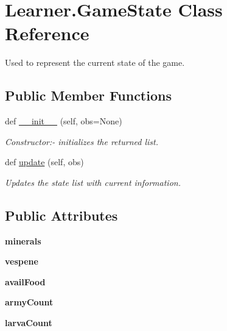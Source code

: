 \hypertarget{classLearner_1_1GameState}{}\section{Learner.\+Game\+State Class Reference}
\label{classLearner_1_1GameState}


Used to represent the current state of the game.  


\subsection*{Public Member Functions}
\begin{DoxyCompactItemize}
\item 
def \hyperlink{classLearner_1_1GameState_a1839473bc83bc75d01684ec5aea9cbb8}{\+\_\+\+\_\+init\+\_\+\+\_\+} (self, obs=None)
\begin{DoxyCompactList}\small\item\em Constructor\+:-\/ initializes the returned list. \end{DoxyCompactList}\item 
def \hyperlink{classLearner_1_1GameState_a6f8a28737862d479f5bf027296613ea1}{update} (self, obs)
\begin{DoxyCompactList}\small\item\em Updates the state list with current information. \end{DoxyCompactList}\end{DoxyCompactItemize}
\subsection*{Public Attributes}
\begin{DoxyCompactItemize}
\item 
{\bfseries minerals}\hypertarget{classLearner_1_1GameState_a386c1763948e0b1d0d5cccfb2249dab5}{}\label{classLearner_1_1GameState_a386c1763948e0b1d0d5cccfb2249dab5}

\item 
{\bfseries vespene}\hypertarget{classLearner_1_1GameState_a1cfbd3d55a66b1897be33620ace654c0}{}\label{classLearner_1_1GameState_a1cfbd3d55a66b1897be33620ace654c0}

\item 
{\bfseries avail\+Food}\hypertarget{classLearner_1_1GameState_ac42a209d42ef18e10585f3adeb1b71c9}{}\label{classLearner_1_1GameState_ac42a209d42ef18e10585f3adeb1b71c9}

\item 
{\bfseries army\+Count}\hypertarget{classLearner_1_1GameState_a2e78cbeaff230eaaa0abab498f5f5930}{}\label{classLearner_1_1GameState_a2e78cbeaff230eaaa0abab498f5f5930}

\item 
{\bfseries larva\+Count}\hypertarget{classLearner_1_1GameState_a9fbf37652166056005e255288d8fe624}{}\label{classLearner_1_1GameState_a9fbf37652166056005e255288d8fe624}

\end{DoxyCompactItemize}


